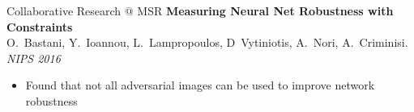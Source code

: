 \documentclass[t,xcolor=dvipsnames]{beamer}
\begin{document}

\begin{frame}{Collaborative Research @ MSR}
\textbf{Measuring Neural Net Robustness with Constraints}\\{\footnotesize O.\ Bastani, Y.\ Ioannou, L.\ Lampropoulos, D\ Vytiniotis, A.\ Nori, A.\ Criminisi.\\\textit{NIPS 2016}}
\begin{itemize}
    \item Found that not all adversarial images can be used to improve network robustness
\end{itemize}
\end{frame}
\end{document}
